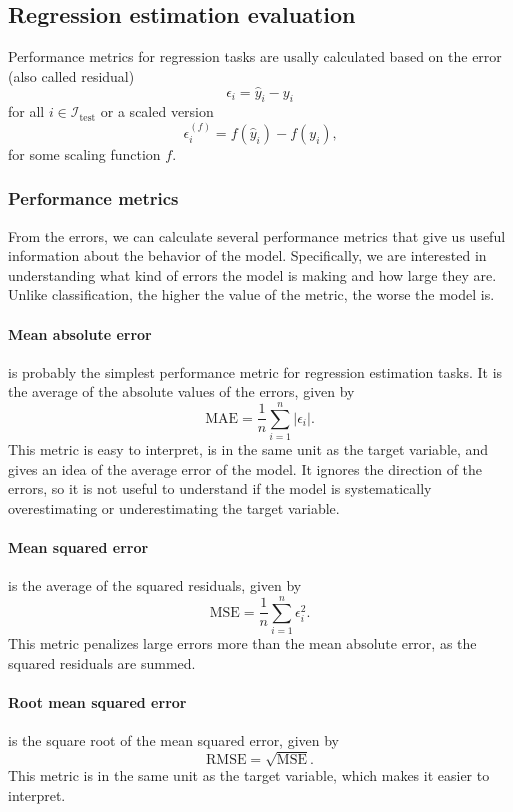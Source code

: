 \subsection{Regression estimation evaluation}

Performance metrics for regression tasks are usally calculated based on the error (also
called residual) $$\epsilon_i = \hat{y}_i - y_i$$ for all $i \in \mathcal{I}_\text{test}$ or
a scaled version $$\epsilon_i^{(f)} = f(\hat{y}_i) - f(y_i)\text{,}$$ for some scaling
function $f$.

\subsubsection{Performance metrics}

From the errors, we can calculate several performance metrics that give us useful
information about the behavior of the model.  Specifically, we are interested in
understanding what kind of errors the model is making and how large they are.  Unlike
classification, the higher the value of the metric, the worse the model is.

\paragraph{Mean absolute error} is probably the simplest performance metric for regression
estimation tasks.  It is the average of the absolute values of the errors,
given by
\begin{equation*}
  \text{MAE} = \frac{1}{n} \sum_{i=1}^n | \epsilon_i |\text{.}
\end{equation*}
This metric is easy to interpret, is in the same unit as the target variable, and gives an
idea of the average error of the model.  It ignores the direction of the errors, so it is
not useful to understand if the model is systematically overestimating or underestimating
the target variable.

\paragraph{Mean squared error} is the average of the squared residuals, given by
\begin{equation*}
  \text{MSE} = \frac{1}{n} \sum_{i=1}^n \epsilon_i^2\text{.}
\end{equation*}
This metric penalizes large errors more than the mean absolute error, as the squared
residuals are summed.

\paragraph{Root mean squared error} is the square root of the mean squared error, given by
\begin{equation*}
  \text{RMSE} = \sqrt{\text{MSE}}\text{.}
\end{equation*}
This metric is in the same unit as the target variable, which makes it easier to
interpret.

